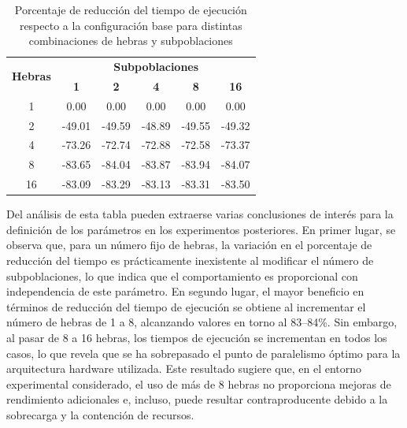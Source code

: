 \begin{table}[ht]
    \centering
    \begin{tabular}{|c|ccccc|}
        \hline
        \multirow{2}{*}{\textbf{Hebras}} & \multicolumn{5}{c|}{\textbf{Subpoblaciones}}                                                      \\ \cline{2-6}
                                         & \textbf{1}                                   & \textbf{2} & \textbf{4} & \textbf{8} & \textbf{16} \\ \hline
        1                                & 0.00                                         & 0.00       & 0.00       & 0.00       & 0.00        \\ \hline
        2                                & -49.01                                       & -49.59     & -48.89     & -49.55     & -49.32      \\ \hline
        4                                & -73.26                                       & -72.74     & -72.88     & -72.58     & -73.37      \\ \hline
        8                                & -83.65                                       & -84.04     & -83.87     & -83.94     & -84.07      \\ \hline
        16                               & -83.09                                       & -83.29     & -83.13     & -83.31     & -83.50      \\ \hline
    \end{tabular}
    \caption{Porcentaje de reducción del tiempo de ejecución respecto a la configuración base para distintas combinaciones de hebras y subpoblaciones}
    \label{tab:exploratory_populations_delta}
\end{table}

Del análisis de esta tabla pueden extraerse varias conclusiones de interés para la definición de los parámetros en los experimentos posteriores. En primer lugar, se observa que, para un número fijo de hebras, la variación en el porcentaje de reducción del tiempo es prácticamente inexistente al modificar el número de subpoblaciones, lo que indica que el comportamiento es proporcional con independencia de este parámetro. En segundo lugar, el mayor beneficio en términos de reducción del tiempo de ejecución se obtiene al incrementar el número de hebras de 1 a 8, alcanzando valores en torno al 83--84\%. Sin embargo, al pasar de 8 a 16 hebras, los tiempos de ejecución se incrementan en todos los casos, lo que revela que se ha sobrepasado el punto de paralelismo óptimo para la arquitectura hardware utilizada. Este resultado sugiere que, en el entorno experimental considerado, el uso de más de 8 hebras no proporciona mejoras de rendimiento adicionales e, incluso, puede resultar contraproducente debido a la sobrecarga y la contención de recursos.

